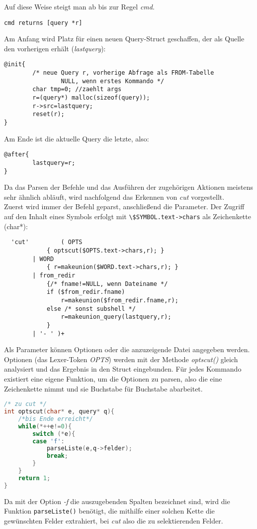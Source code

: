 Auf diese Weise steigt man ab bis zur Regel \textit{cmd}.
\begin{lstlisting}
cmd returns [query *r]
\end{lstlisting}
Am Anfang wird Platz für einen neuen Query-Struct geschaffen, der als Quelle den vorherigen erhält (\textit{lastquery}):
\begin{lstlisting}
@init{
        /* neue Query r, vorherige Abfrage als FROM-Tabelle
                NULL, wenn erstes Kommando */
        char tmp=0; //zaehlt args
        r=(query*) malloc(sizeof(query));
        r->src=lastquery;
        reset(r);
}
\end{lstlisting}
Am Ende ist die aktuelle Query die letzte, also:
\begin{lstlisting}
@after{
        lastquery=r;
}
\end{lstlisting}
Da das Parsen der Befehle und das Ausführen der zugehörigen Aktionen meistens sehr ähnlich abläuft, wird nachfolgend das Erkennen von \textit{cut} vorgestellt.\\
Zuerst wird immer der Befehl geparst, anschließend die Parameter. Der Zugriff auf den Inhalt eines Symbols erfolgt mit \lstinline{\$SYMBOL.text->chars} als Zeichenkette (char*):
\begin{lstlisting}
  'cut'         ( OPTS
			{ optscut($OPTS.text->chars,r); }
		| WORD
			{ r=makeunion($WORD.text->chars,r); }
		| from_redir
			{/* fname!=NULL, wenn Dateiname */
			if ($from_redir.fname)
				r=makeunion($from_redir.fname,r);
			else /* sonst subshell */
				r=makeunion_query(lastquery,r);
			}
		| '- ' )+

\end{lstlisting}
Als Parameter können Optionen oder die anzuzeigende Datei angegeben werden. Optionen (das Lexer-Token \textit{OPTS}) werden mit der Methode \textit{optscut()} gleich analysiert und das Ergebnis in den Struct eingebunden. Für jedes Kommando existiert eine eigene Funktion, um die Optionen zu parsen, also die eine Zeichenkette nimmt und sie Buchstabe für Buchstabe abarbeitet.
\begin{lstlisting}[language=C]
/* zu cut */
int optscut(char* e, query* q){
	/*bis Ende erreicht*/
	while(*++e!=0){
		switch (*e){
		case 'f':
			parseListe(e,q->felder);
			break;
		}
	}
	return 1;
}
\end{lstlisting}
Da mit der Option \textit{-f} die auszugebenden Spalten bezeichnet sind, wird die Funktion \lstinline{parseListe()} benötigt, die mithilfe einer solchen Kette die gewünschten Felder extrahiert, bei \textit{cut} also die zu selektierenden Felder.

